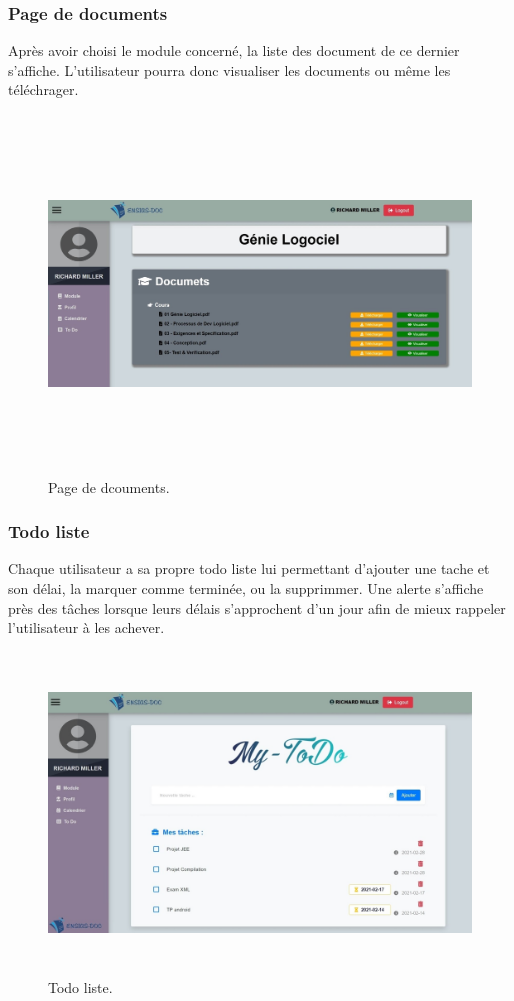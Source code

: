 \documentclass{article}
\begin{document}
{\subsubsection{Page de documents}{Après avoir choisi le module concerné, la liste des document de ce dernier s'affiche. L'utilisateur pourra donc visualiser les documents ou même les téléchrager.
}
\begin{figure}[H]
    \centering
    \includegraphics[width=17cm,height=9.5cm]{docc.jpeg}
    \caption{Page de dcouments.}
    \label{Page de documents.}
\end{figure}

\subsubsection{Todo liste }{Chaque utilisateur a sa propre todo liste lui permettant d'ajouter une tache et son délai, la marquer comme terminée, ou la supprimmer. Une alerte s'affiche près des tâches lorsque leurs délais s'approchent d'un jour afin de mieux rappeler l'utilisateur à les achever.
\begin{figure}[H]
    \centering
    \includegraphics[width=17cm,height=8.5cm]{todooo.jpeg}
    \caption{Todo liste.}
    \label{Todo liste.}
\end{figure}

}}
\end{document}
